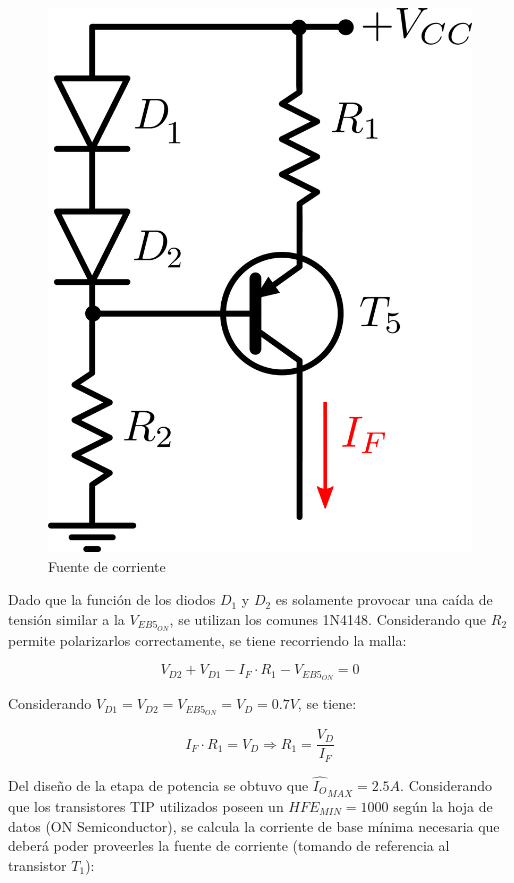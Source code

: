 \begin{figure}[!ht]
\begin{centering}
\includegraphics[scale=0.5]{Imagenes/FuenteIF.png}
\par\end{centering}
\caption{Fuente de corriente}
\end{figure}

Dado que la función de los diodos $D_1$ y $D_2$ es solamente provocar una caída de tensión similar a la $V_{EB5_{ON}}$, se utilizan los comunes 1N4148. Considerando que $R_2$ permite polarizarlos correctamente, se tiene recorriendo la malla:

\[
V_{D2} + V_{D1} - I_F \cdot R_1 - V_{EB5_{ON}} = 0
\]

Considerando $V_{D1} = V_{D2} = V_{EB5_{ON}} = V_D = 0.7V$, se tiene:

\[
I_F \cdot R_1 = V_D \Longrightarrow R_1 = \frac{V_D}{I_F}
\]

Del diseño de la etapa de potencia se obtuvo que $\hat{I_O}_{MAX} = 2.5A$. Considerando que los transistores TIP utilizados poseen un $HFE_{MIN} = 1000$ según la hoja de datos (ON Semiconductor), se calcula la corriente de base mínima necesaria que deberá poder proveerles la fuente de corriente (tomando de referencia al transistor $T_1$):

